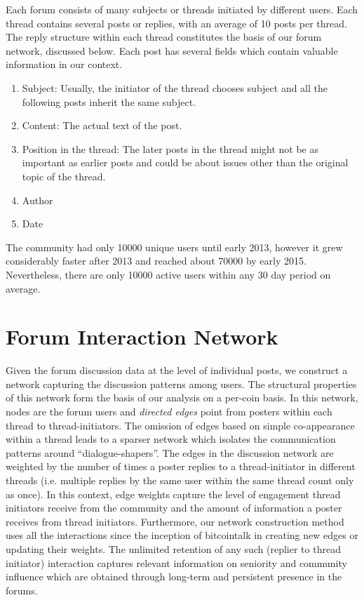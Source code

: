 Each forum consists of many subjects or threads initiated by different users.
Each thread contains several posts or replies, with an average of 10 posts per
thread.  The reply structure within each thread constitutes the basis of our
forum network, discussed below.  Each post has several fields which contain
valuable information in our context.
\begin{enumerate}
  \item{Subject:} Usually, the initiator of the thread chooses subject and all the
    following posts inherit the same subject.
  \item{Content:} The actual text of the post.
  \item{Position in the thread}: The later posts in the thread might not be as important
    as earlier posts and could be about issues other than the original topic of the thread.
  \item{Author}
  \item{Date}
\end{enumerate}

The community had only 10000 unique users until early 2013, however it grew considerably faster after 2013 and reached about 70000 by early 2015.
Nevertheless, there are only 10000 active users within any 30 day period on average.


\section{Forum Interaction Network}

Given the forum discussion data at the level of individual posts, we  construct a network capturing the discussion patterns among users. The structural properties of this network form the basis of our analysis on a per-coin basis. In this network, nodes are the forum users and \textit{directed edges} point from posters within each thread to thread-initiators. The omission of edges based on simple co-appearance within a thread leads to a sparser network which isolates the communication patterns around ``dialogue-shapers''. The edges in the discussion network are weighted by the number of times a poster replies to a thread-initiator in different threads (i.e. multiple replies by the same user within the same thread count only as once).
In this context, edge weights capture the level of engagement thread initiators receive from the community and the amount of information a poster receives from thread initiators. Furthermore, our network construction method uses all the interactions since the inception of bitcointalk in creating new edges or updating their weights. The unlimited retention of any such (replier to thread initiator) interaction captures relevant information on seniority and community influence which are obtained through long-term and persistent presence in the forums. 

